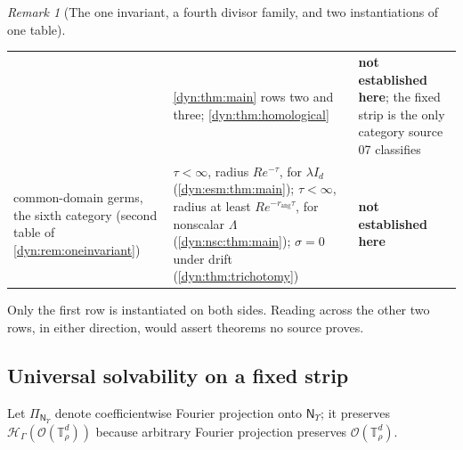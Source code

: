 \documentclass[11pt,letterpaper]{article}
\theoremstyle{definition}
\theoremstyle{remark}
\newtheorem{remark}[remark]{Remark}
\newcommand{\HH}{\mathscr H}
\newcommand{\OO}{\mathcal O}
\newcommand{\TT}{\mathbb T}
\newcommand{\strip}{\OO(\TT^{d}_{\rho})}
\newcommand{\qlat}{\mathsf N_{\Upsilon}}
\newcommand{\rang}{r_{\mathrm{ang}}}
\numberwithin{equation}{section}
\begin{document}
\begin{remark}[The one invariant, a fourth divisor family, and two
instantiations of one table]
\begin{center}
\begin{tabular}{@{}P{0.30\textwidth}P{0.29\textwidth}P{0.31\textwidth}@{}}
& \cref{dyn:thm:main} rows two and three; \cref{dyn:thm:homological}
& \textbf{not established here}; the fixed strip is the only category
source 07 classifies\\[3pt]
common-domain germs, the sixth category (second table of
\cref{dyn:rem:oneinvariant})
& $\tau<\infty$, radius $Re^{-\tau}$, for $\lambda I_d$
 (\cref{dyn:esm:thm:main}); $\tau<\infty$, radius at least
 $Re^{-\rang\tau}$, for nonscalar $\Lambda$ (\cref{dyn:nsc:thm:main});
 $\sigma=0$ under
 drift (\cref{dyn:thm:trichotomy})
& \textbf{not established here}\\
\bottomrule
\end{tabular}
\end{center}
Only the first row is instantiated on both sides. Reading across the other
two rows, in either direction, would assert theorems no source proves.
\end{remark}


\subsection{Universal solvability on a fixed strip}

Let $\Pi_{\qlat}$ denote coefficientwise Fourier projection onto $\qlat$;
it preserves $\HH_\Gamma(\strip)$ because arbitrary Fourier projection
preserves $\strip$.
\end{document}
